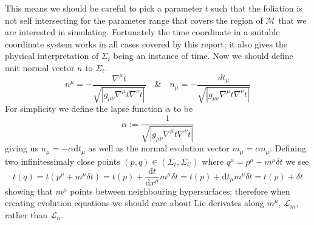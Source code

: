 \documentclass[11pt, oneside]{report}  %
\newcommand{\M}{\mathcal{M}}
\renewcommand{\L}{\mathcal{L}}
\newcommand{\dd}{\mathrm{d}}
\numberwithin{equation}{section}
\begin{document}
This means we should be careful to pick a parameter $t$ such that the foliation is not self intersecting for the parameter range that covers the region of $\M$ that we are interested in simulating. Fortunately the time coordinate in a suitable coordinate system works in all cases covered by this report; it also gives the physical interpretation of $\Sigma_t$ being an instance of time. Now we should define unit normal vector $n$ to $\Sigma_t$.
\begin{equation} n^\mu = -\frac{\nabla^\mu t}{\sqrt{|g_{\mu\nu}\nabla^\mu t \nabla^\nu t|}} \quad \& \quad  n_\mu = -\frac{dt_\mu}{\sqrt{|g_{\mu\nu}\nabla^\mu t \nabla^\nu t|}}\end{equation}
For simplicity we define the lapse function $\alpha$ to be
\begin{equation}\alpha :=  \frac{1}{\sqrt{|g_{\mu\nu}\nabla^\mu t \nabla^\nu t|}} \end{equation}
giving us $n_\mu = -\alpha \dd t_\mu$ as well as the normal evolution vector $m_\mu = \alpha n_\mu$. Defining two infinitessimaly close points $(p,q)\in(\Sigma_t,\Sigma_{t'})$ where $ q^\mu = p^\mu + m^\mu\delta t$ we see
\begin{equation} t(q) = t(p^\mu +  m^\mu\delta t) = t(p) + \frac{\dd t}{\dd x^\mu}m^\mu\delta t = t(p) + \dd t_\mu m^\mu \delta t =  t(p) + \delta t\end{equation} 
showing that $m^\mu$ points between neighbouring hypersurfaces; therefore when creating evolution equations we should care about Lie derivates along $m^\mu$, $\L_m$, rather than $\L_n$.
\end{document}
